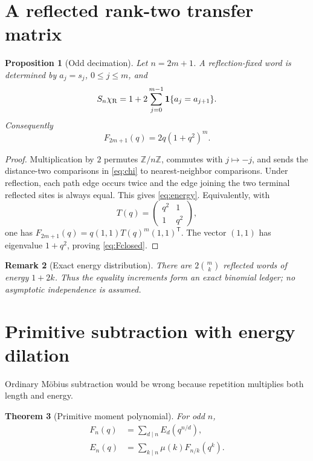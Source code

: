 \documentclass[11pt]{article}
\newtheorem{theorem}{Theorem}[section]
\newtheorem{proposition}[theorem]{Proposition}
\newtheorem{remark}[theorem]{Remark}
\newcommand{\chiR}{\chi_{\rm R}}
\begin{document}
\section{A reflected rank-two transfer matrix}

\begin{proposition}[Odd decimation]\label{prop:decimation}
Let $n=2m+1$.  A reflection-fixed word is determined by
$a_j=s_j$, $0\le j\le m$, and
\begin{equation}\label{eq:energy}
 S_n\chiR=1+2\sum_{j=0}^{m-1}\mathbf1\{a_j=a_{j+1}\}.
\end{equation}
Consequently
\begin{equation}\label{eq:Fclosed}
 F_{2m+1}(q)=2q(1+q^2)^m.
\end{equation}
\end{proposition}

\begin{proof}
Multiplication by $2$ permutes $\mathbb Z/n\mathbb Z$, commutes with
$j\mapsto-j$, and sends the distance-two comparisons in \eqref{eq:chi} to
nearest-neighbor comparisons.  Under reflection, each path edge occurs twice
and the edge joining the two terminal reflected sites is always equal.  This
gives \eqref{eq:energy}.  Equivalently, with
\[
 T(q)=\begin{pmatrix}q^2&1\\1&q^2\end{pmatrix},
\]
one has $F_{2m+1}(q)=q(1,1)T(q)^m(1,1)^{\mathsf T}$.  The vector $(1,1)$
has eigenvalue $1+q^2$, proving \eqref{eq:Fclosed}.
\end{proof}

\begin{remark}[Exact energy distribution]
There are $2\binom mk$ reflected words of energy $1+2k$.  Thus the equality
increments form an exact binomial ledger; no asymptotic independence is
assumed.
\end{remark}

\section{Primitive subtraction with energy dilation}

Ordinary M\"obius subtraction would be wrong because repetition multiplies
both length and energy.

\begin{theorem}[Primitive moment polynomial]\label{thm:primitive}
For odd $n$,
\begin{align}
 F_n(q)&=\sum_{d\mid n}E_d(q^{n/d}),\label{eq:dilation}\\
 E_n(q)&=\sum_{k\mid n}\mu(k)F_{n/k}(q^k).\label{eq:mobius}
\end{align}
\end{theorem}
\end{document}
